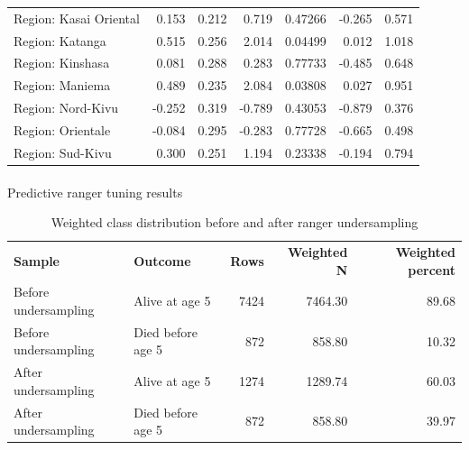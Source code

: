 \documentclass[
  11pt,
  a4paper,
]{article}
\makeatletter
\let\oldparagraph\paragraph
\renewcommand{\paragraph}{
    \@ifstar
      \xxxParagraphStar
      \xxxParagraphNoStar
  }
\newcommand{\xxxParagraphStar}[1]{\oldparagraph*{#1}\mbox{}}
\newcommand{\xxxParagraphNoStar}[1]{\oldparagraph{#1}\mbox{}}
\makeatother
\begin{document}
\begin{longtable}[t]{>{\raggedright\arraybackslash}p{4.5cm}rrrlrr}
Region: Kasai Oriental & 0.153 & 0.212 & 0.719 & 0.47266 & -0.265 & 0.571\\
\addlinespace
Region: Katanga & 0.515 & 0.256 & 2.014 & 0.04499 & 0.012 & 1.018\\
Region: Kinshasa & 0.081 & 0.288 & 0.283 & 0.77733 & -0.485 & 0.648\\
Region: Maniema & 0.489 & 0.235 & 2.084 & 0.03808 & 0.027 & 0.951\\
Region: Nord-Kivu & -0.252 & 0.319 & -0.789 & 0.43053 & -0.879 & 0.376\\
Region: Orientale & -0.084 & 0.295 & -0.283 & 0.77728 & -0.665 & 0.498\\
\addlinespace
Region: Sud-Kivu & 0.300 & 0.251 & 1.194 & 0.23338 & -0.194 & 0.794\\
\bottomrule

\end{longtable}

\endgroup{}

\paragraph{Predictive ranger tuning
results}\label{predictive-ranger-tuning-results}

\begingroup\fontsize{11}{13}\selectfont

\begin{longtable}[t]{llrrr}

\caption{\label{tbl-appendix-ranger-sampling-summary}Weighted class
distribution before and after ranger undersampling}

\tabularnewline

\\
\toprule
\textbf{Sample} & \textbf{Outcome} & \textbf{Rows} & \textbf{Weighted N} & \textbf{Weighted percent}\\
\midrule
Before undersampling & Alive at age 5 & 7424 & 7464.30 & 89.68\\
Before undersampling & Died before age 5 & 872 & 858.80 & 10.32\\
After undersampling & Alive at age 5 & 1274 & 1289.74 & 60.03\\
After undersampling & Died before age 5 & 872 & 858.80 & 39.97\\
\bottomrule

\end{longtable}

\endgroup{}

\begingroup\fontsize{11}{13}\selectfont
\end{document}
